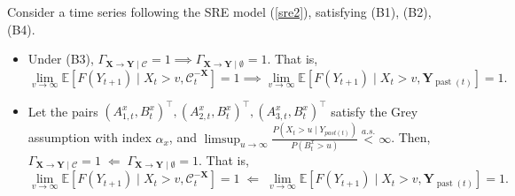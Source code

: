 \documentclass[a4paper,11pt]{article}
\newenvironment{customthm}[1]
  {\renewcommand\theinnercustomthm{#1}\innercustomthm}
  {\endinnercustomthm}
\DeclareMathOperator{\past}{past}
\begin{document}
\begin{customthm}{\ref{Theorem1}}
Consider a time series following the SRE model (\ref{sre2}), satisfying (B1), (B2), (B4). 
\begin{itemize}
\item Under (B3), $\Gamma_{\textbf{X}\to\textbf{Y}\mid\mathcal{C}} = 1 \implies \Gamma_{\textbf{X}\to\textbf{Y}\mid \emptyset} = 1$. That is, 
\begin{equation*}
\lim_{v\to\infty} \mathbb{E}[ F(Y_{t+1})\mid X_t>v,\mathcal{C}^{-\textbf{X}}_t]=1 \implies \lim_{v\to\infty} \mathbb{E}[ F(Y_{t+1})\mid X_t>v, \textbf{Y}_{\past(t)}]=1. 
\end{equation*}
\item Let the pairs  $(A^x_{1,t},B^x_t)^\top,(A^x_{2,t},B^x_t)^\top,(A^x_{3,t},B^x_t)^\top$ satisfy the Grey assumption with index $\alpha_x$, and $\operatorname{lim sup}_{u\to\infty}\frac{P(X_t>u\mid Y_{past(t)})}{P(B_t^x>u)}\overset{a.s.}{<}\infty$. Then, $\Gamma_{\textbf{X}\to\textbf{Y}\mid\mathcal{C}} = 1 \;\Longleftarrow\; \Gamma_{\textbf{X}\to\textbf{Y}\mid \emptyset} = 1$. That is, 
\begin{equation*}
\lim_{v\to\infty} \mathbb{E}[ F(Y_{t+1})\mid X_t>v,\mathcal{C}^{-\textbf{X}}_t]=1 \;\Longleftarrow\; \lim_{v\to\infty} \mathbb{E}[ F(Y_{t+1})\mid X_t>v, \textbf{Y}_{\past(t)}]=1. 
\end{equation*}
\end{itemize}
\end{customthm}
\end{document}
